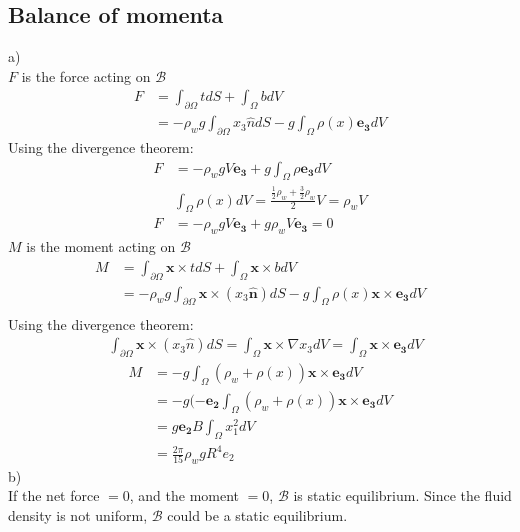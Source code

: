 \documentclass{elsarticle}
\begin{document}
\subsection{Balance of momenta}
a)\\
$F$ is the force acting on $\mathcal{B}$
\begin{align*}
    F&=\int_{\partial\Omega}tdS+\int_{\Omega}bdV\\
    &=-\rho_w g\int_{\partial\Omega}x_3\hat{n}dS-g\int_{\Omega}\rho(x)\bm{e_3}dV
\end{align*}
Using the divergence theorem:
\begin{align*}
    F&=-\rho_wgV\bm{e_3}+g\int_\Omega\rho\bm{e_3}dV\\
    &\int_{\Omega}\rho(x)dV=\frac{\frac{1}{2}\rho_w+\frac{3}{2}\rho_w}{2}V=\rho_wV\\
    F&=-\rho_w gV\bm{e_3}+g\rho_wV\bm{e_3}=0
\end{align*}
$M$ is the moment acting on $\mathcal{B}$
\begin{align*}
    M&=\int_{\partial\Omega}\bm{x}\times tdS+\int_{\Omega}\bm{x}\times bdV\\
    &=-\rho_w g\int_{\partial\Omega}\bm{x}\times(x_3\bm{\hat{n}})dS-g\int_{\Omega}\rho(x)\bm{x}\times\bm{e_3}dV\\
\end{align*}
Using the divergence theorem:
\begin{align*}
    &\int_{\partial\Omega}\bm{x}\times(x_3\hat{n})dS=\int_{\Omega}\bm{x}\times\nabla x_3 dV=\int_{\Omega}\bm{x}\times\bm{e_3}dV
\end{align*}
\begin{align*}
    M&=-g\int_{\Omega}(\rho_w+\rho(x))\bm{x}\times\bm{e_3}dV\\
    &=-g(-\bm{e_2}\int_{\Omega}(\rho_w+\rho(x))\bm{x}\times\bm{e_3}dV\\
    &=g\bm{e_2}B\int_{\Omega}x_1^2dV\\
    &=\frac{2\pi}{15}\rho_wgR^4e_2
\end{align*}
b)\\
If the net force $=0$, and the moment $=0$, $\mathcal{B}$ is static equilibrium. Since the fluid density is not uniform, $\mathcal{B}$ could be a static equilibrium.
\end{document}
